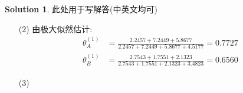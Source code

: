 \documentclass[a4paper,UTF8]{article}
\numberwithin{equation}{section}
\theoremstyle{definition}
\newtheorem*{solution}{Solution}
\begin{document}
\begin{solution}
    此处用于写解答(中英文均可)
    \begin{table}[H]
        \centering
        \setlength{\abovecaptionskip}{0pt}
        \setlength{\belowcaptionskip}{5pt}
        \caption{实验数据}
        \label{table: EM}
    \end{table}
    \begin{enumerate}
        \item [(2)]
        由极大似然估计: 
        \begin{align*}
            \theta_{A}^{(1)}&= \frac{2.2457+7.2449+5.8677}{2.2457+7.2449+5.8677+4.5177}=0.7727 \\ \theta_{B}^{(1)}&=\frac{2.7543+1.7551+2.1323}{2.7543+1.7551+2.1323+3.4823}=0.6560
        \end{align*}
        \item [(3)]




  

\end{enumerate}
\end{solution}
\end{document}
